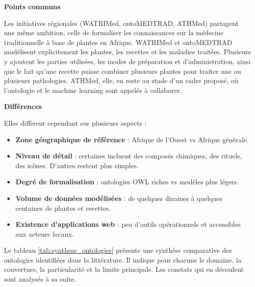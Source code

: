 \textbf{Points communs}

Les initiatives régionales (WATRIMed, ontoMEDTRAD, ATHMed) partagent une même ambition, celle de formaliser les connaissances sur la médecine traditionnelle à base de plantes en Afrique. WATRIMed et ontoMEDTRAD modélisent explicitement les plantes, les recettes et les maladies traitées. Plusieurs y ajoutent les parties utilisées, les modes de préparation et d'administration, ainsi que le fait qu'une recette puisse combiner plusieurs plantes pour traiter une ou plusieurs pathologies. ATHMed, elle, en reste au stade d'un cadre proposé, où l'ontologie et le machine learning sont appelés à collaborer.

\textbf{Différences}

Elles diffèrent cependant sur plusieurs aspects :
\begin{itemize}[label={$\bullet$}, leftmargin=1cm]
    \item \textbf{Zone géographique de référence} : Afrique de l'Ouest vs Afrique générale.
    \item \textbf{Niveau de détail} : certaines incluent des composés chimiques, des rituels, des icônes. D'autres restent plus simples.
    \item \textbf{Degré de formalisation} : ontologies OWL riches vs modèles plus légers.
    \item \textbf{Volume de données modélisées} : de quelques dizaines à quelques centaines de plantes et recettes.
    \item \textbf{Existence d'applications web} : peu d'outils opérationnels et accessibles aux acteurs locaux.
\end{itemize}

Le tableau \ref{tab:synthese_ontologies} présente une synthèse comparative des ontologies identifiées dans la littérature. Il indique pour chacune le domaine, la couverture, la particularité et la limite principale. Les constats qui en découlent sont analysés à sa suite.

